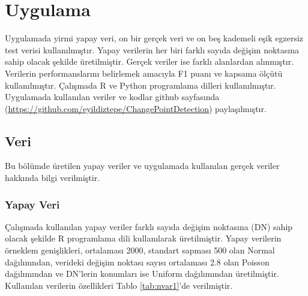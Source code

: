 \documentclass[12pt,twoside]{deuthesis}
\begin{document}
\chapter{Uygulama}\label{Bolum3}

Uygulamada yirmi yapay veri, on bir gerçek veri ve on beş kademeli eşik egzersiz test verisi kullanılmıştır. Yapay verilerin her biri farklı sayıda değişim noktasına sahip olacak şekilde üretilmiştir. Gerçek veriler ise farklı alanlardan alınmıştır. Verilerin performanslarını belirlemek amacıyla F1 puanı ve kapsama ölçütü kullanılmıştır. Çalışmada R ve Python programlama dilleri kullanılmıştır. Uygulamada kullanılan veriler ve kodlar github sayfasında (\url{https://github.com/eyildiztepe/ChangePointDetection}) paylaşılmıştır.

\section{Veri}\label{veri}

Bu bölümde üretilen yapay veriler ve uygulamada kullanılan gerçek veriler hakkında bilgi verilmiştir.

\subsection{Yapay Veri}\label{yapay-veri}

Çalışmada kullanılan yapay veriler farklı sayıda değişim noktasına (DN) sahip olacak şekilde R programlama dili kullanılarak üretilmiştir. Yapay verilerin örneklem genişlikleri, ortalaması 2000, standart sapması 500 olan Normal dağılımndan, verideki değişim noktası sayısı ortalaması 2.8 olan Poisson dağılımından ve DN'lerin konumları ise Uniform dağılımından üretilmiştir. Kullanılan verilerin özellikleri Tablo \ref{tab:nvar1}'de verilmiştir.
\end{document}
